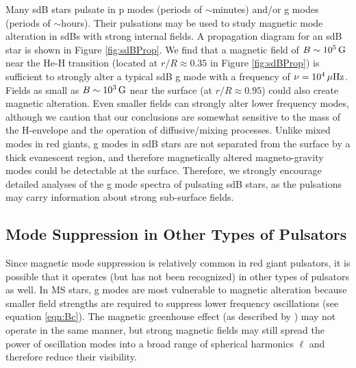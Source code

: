 Many sdB stars pulsate in p modes (periods of $\sim$minutes) and/or g modes (periods of $\sim$hours). Their pulsations may be used to study magnetic mode alteration in sdBs with strong internal fields. A propagation diagram for an sdB star is shown in Figure \ref{fig:sdBProp}. We find that a magnetic field of $B\sim 10^5 \, {\rm G}$ near the He-H transition (located at $r/R \approx 0.35$ in Figure \ref{fig:sdBProp}) is sufficient to strongly alter a typical sdB g mode with a frequency of $\nu = 10^4 \, \mu {\rm Hz}$. Fields as small as $B\sim 10^3 \, {\rm G}$ near the surface (at $r/R \approx 0.95$) could also create magnetic alteration. Even smaller fields can strongly alter lower frequency modes, although we caution that our conclusions are somewhat sensitive to the mass of the H-envelope and the operation of diffusive/mixing processes. Unlike mixed modes in red giants, g modes in sdB stars are not separated from the surface by a thick evanescent region, and therefore magnetically altered magneto-gravity modes could be detectable at the surface. Therefore, we strongly encourage detailed analyses of the g mode spectra of pulsating sdB stars, as the pulsations may carry information about strong sub-surface fields. 



\subsection{Mode Suppression in Other Types of Pulsators}
  
Since magnetic mode suppression is relatively common in red giant pulsators, it is possible that it operates (but has not been recognized) in other types of pulsators as well. In MS stars, g modes are most vulnerable to magnetic alteration because smaller field strengths are required to suppress lower frequency oscillations (see equation \ref{eqn:Bc}). The magnetic greenhouse effect (as described by \cite{Fuller_2015}) may not operate in the same manner, but strong magnetic fields may still spread the power of oscillation modes into a broad range of spherical harmonics $\ell$ and therefore reduce their visibility. 

